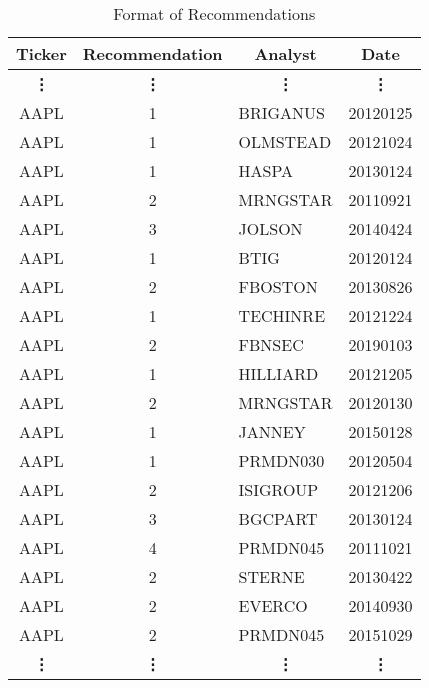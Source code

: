 \begin{table}[H]
\centering
\begin{tabular}{@{}ccll@{}}
\toprule\toprule
\multicolumn{1}{c}{Ticker} & \multicolumn{1}{c}{Recommendation} & \multicolumn{1}{c}{Analyst} & \multicolumn{1}{c}{Date} \\ \midrule
\multicolumn{1}{c}{\bf\vdots} & \multicolumn{1}{c}{\bf\vdots} & \multicolumn{1}{c}{\bf\vdots} & \multicolumn{1}{c}{\bf\vdots}  \\
AAPL   & 1      & BRIGANUS   & 20120125 \\
AAPL   & 1      & OLMSTEAD   & 20121024 \\
AAPL   & 1      & HASPA      & 20130124 \\
AAPL   & 2      & MRNGSTAR   & 20110921 \\
AAPL   & 3      & JOLSON     & 20140424 \\
AAPL   & 1      & BTIG       & 20120124 \\
AAPL   & 2      & FBOSTON    & 20130826 \\
AAPL   & 1      & TECHINRE   & 20121224 \\
AAPL   & 2      & FBNSEC     & 20190103 \\
AAPL   & 1      & HILLIARD   & 20121205 \\
AAPL   & 2      & MRNGSTAR   & 20120130 \\
AAPL   & 1      & JANNEY     & 20150128 \\
AAPL   & 1      & PRMDN030   & 20120504 \\
AAPL   & 2      & ISIGROUP   & 20121206 \\
AAPL   & 3      & BGCPART    & 20130124 \\
AAPL   & 4      & PRMDN045   & 20111021 \\
AAPL   & 2      & STERNE     & 20130422 \\
AAPL   & 2      & EVERCO     & 20140930 \\
AAPL   & 2      & PRMDN045   & 20151029 \\ 
\multicolumn{1}{c}{\bf\vdots} & \multicolumn{1}{c}{\bf\vdots} & \multicolumn{1}{c}{\bf\vdots} & \multicolumn{1}{c}{\bf\vdots}  \\\bottomrule
\end{tabular}
\caption{Format of Recommendations}
\label{tab:recommendations}
\end{table}
